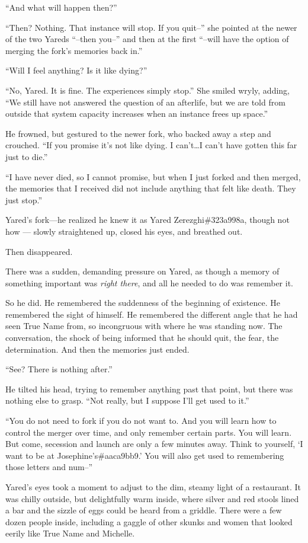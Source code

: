 ``And what will happen then?''

``Then? Nothing. That instance will stop. If you quit--'' she pointed at the newer of the two Yareds ``--then you--'' and then at the first ``--will have the option of merging the fork's memories back in.''

``Will I feel anything? Is it like dying?''

``No, Yared. It is fine. The experiences simply stop.'' She smiled wryly, adding, ``We still have not answered the question of an afterlife, but we are told from outside that system capacity increases when an instance frees up space.''

He frowned, but gestured to the newer fork, who backed away a step and crouched. ``If you promise it's not like dying. I can't\ldots I can't have gotten this far just to die.''

``I have never died, so I cannot promise, but when I just forked and then merged, the memories that I received did not include anything that felt like death. They just stop.''

Yared's fork---he realized he knew it as Yared Zerezghi\#323a998a, though not how — slowly straightened up, closed his eyes, and breathed out.

Then disappeared.

There was a sudden, demanding pressure on Yared, as though a memory of something important was \emph{right there}, and all he needed to do was remember it.

So he did. He remembered the suddenness of the beginning of existence. He remembered the sight of himself. He remembered the different angle that he had seen True Name from, so incongruous with where he was standing now. The conversation, the shock of being informed that he should quit, the fear, the determination. And then the memories just ended.

``See? There is nothing after.''

He tilted his head, trying to remember anything past that point, but there was nothing else to grasp. ``Not really, but I suppose I'll get used to it.''

``You do not need to fork if you do not want to. And you will learn how to control the merger over time, and only remember certain parts. You will learn. But come, secession and launch are only a few minutes away. Think to yourself, `I want to be at Josephine's\#aaca9bb9.' You will also get used to remembering those letters and num--''

Yared's eyes took a moment to adjust to the dim, steamy light of a restaurant. It was chilly outside, but delightfully warm inside, where silver and red stools lined a bar and the sizzle of eggs could be heard from a griddle. There were a few dozen people inside, including a gaggle of other skunks and women that looked eerily like True Name and Michelle.

